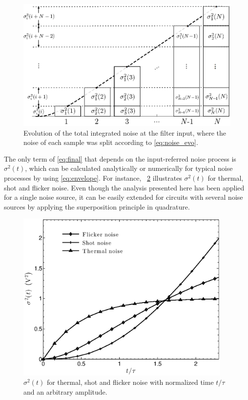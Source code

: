 \begin{figure}[!t]
	\centering
	\includegraphics[width=5in]{./Figures/envelope-example.eps}
	\caption[Evolution of the total integrated noise at the filter input.]{Evolution of the total integrated noise at the filter input, where the noise of each sample was split according to \eqref{eq:noise_evo}.}\label{fig:envelope-example}
\end{figure}

The only term of \eqref{eq:final} that depends on the input-referred noise process is $\sigma^2(t)$, which can be calculated analytically or numerically for typical noise processes by using \eqref{eq:envelope}. For instance, \figurename~\ref{fig:envelopes} illustrates $\sigma^2(t)$ for thermal, shot and flicker noise. Even though the analysis presented here has been applied for a single noise source, it can be easily extended for circuits with several noise sources by applying the superposition principle in quadrature. 

\begin{figure}[!t]
	\centering
	\includegraphics[width=4.2in]{./Figures/envelopes.eps}
	\caption[$\sigma^2(t)$ for thermal, shot and flicker noise.]{$\sigma^2(t)$ for thermal, shot and flicker noise with normalized time $t/\tau$ and an arbitrary amplitude.}\label{fig:envelopes}
\end{figure}


